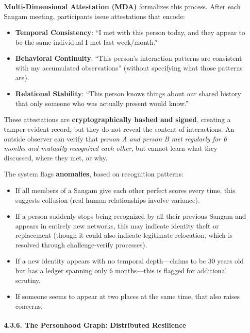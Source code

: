 \textbf{Multi-Dimensional Attestation (MDA)} formalizes this process.
After each Sangam meeting, participants issue attestations that encode:

\begin{itemize}
\tightlist
\item
  \textbf{Temporal Consistency}: ``I met with this person today, and
  they appear to be the same individual I met last week/month.''
\item
  \textbf{Behavioral Continuity}: ``This person's interaction patterns
  are consistent with my accumulated observations'' (without specifying
  what those patterns are).
\item
  \textbf{Relational Stability}: ``This person knows things about our
  shared history that only someone who was actually present would
  know.''
\end{itemize}

These attestations are \textbf{cryptographically hashed and signed},
creating a tamper-evident record, but they do not reveal the content of
interactions. An outside observer can verify that \emph{person A and
person B met regularly for 6 months and mutually recognized each other},
but cannot learn what they discussed, where they met, or why.

The system flags \textbf{anomalies}, based on recognition patterns:

\begin{itemize}
\tightlist
\item
  If all members of a Sangam give each other perfect scores every time,
  this suggests collusion (real human relationships involve variance).
\item
  If a person suddenly stops being recognized by all their previous
  Sangam and appears in entirely new networks, this may indicate
  identity theft or replacement (though it could also indicate
  legitimate relocation, which is resolved through challenge-verify
  processes).
\item
  If a new identity appears with no temporal depth---claims to be 30
  years old but has a ledger spanning only 6 months---this is flagged
  for additional scrutiny.
\item
  If someone seems to appear at two places at the same time, that also
  raises concerns.
\end{itemize}

\paragraph{4.3.6. The Personhood Graph: Distributed
Resilience}\label{the-personhood-graph-distributed-resilience}

